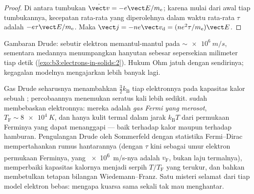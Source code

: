 \begin{proof}
Di antara tumbukan $\dot{\vect v} = -e\vect E/m_{\text{e}}$;
karena mulai dari awal tiap tumbukannya, kecepatan rata-rata yang
diperolehnya dalam waktu rata-rata $\tau$ adalah $-e\tau\vect E/m_{\text{e}}$. Maka $\vect j =
-ne\vect v_{\text{d}} = (ne^2\tau/m_{\text{e}})\vect E$.
\end{proof}

\begin{omfigure}

{\small Gambaran Drude: sebutir elektron memantul-mantul pada
$\sim\qty{e6}{m/s}$, sementara medannya menumpangkan hanyutan sebesar
sepersekian milimeter tiap detik
(\cref{exo:b3:electrons-in-solids:2}). Hukum Ohm jatuh dengan
sendirinya; kegagalan modelnya mengajarkan lebih banyak lagi.}
\end{omfigure}

\begin{remark}\label{rem:b3:electrons-in-solids:sommerfeld}
Gas Drude seharusnya menambahkan $\tfrac32k_{\text{B}}$ tiap elektronnya pada
kapasitas kalor sebuah ; percobaannya menemukan seratus kali lebih sedikit.
 sudah membebaskan elektronnya:
mereka adalah \emph{gas Fermi yang merosot}, $T_{\text{F}} \sim
\qty{8e4}{K}$, dan hanya kulit termal dalam jarak
$k_{\text{B}}T$ dari permukaan Ferminya yang dapat menanggapi --- baik
terhadap kalor maupun terhadap hamburan. Pengulangan Drude oleh
Sommerfeld dengan statistika Fermi--Dirac mempertahankan rumus
hantarannya (dengan $\tau$ kini sebagai umur elektron permukaan
Ferminya, yang \qty{e6}{m/s}-nya adalah
$v_{\text{F}}$, bukan laju termalnya), memperbaiki kapasitas kalornya
menjadi serpih $T/T_{\text{F}}$ yang terukur, dan bahkan membetulkan
tetapan bilangan Wiedemann--Franz. Satu misteri selamat dari tiap
model elektron bebas: mengapa kuarsa sama sekali tak mau menghantar.
\end{remark}

